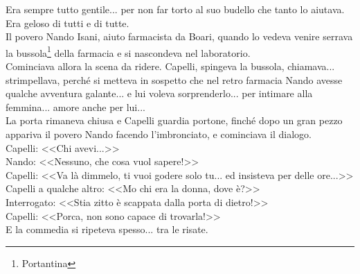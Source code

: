 \indent Era sempre tutto gentile... per non far torto al suo budello che tanto lo aiutava. Era geloso di tutti e di tutte.\\
\indent Il povero Nando Isani, aiuto farmacista da Boari, quando lo vedeva venire serrava la bussola\footnote{Portantina} della farmacia e si nascondeva nel laboratorio.\\
\indent Cominciava allora la scena da ridere. Capelli, spingeva la bussola, chiamava... strimpellava, perché si metteva in sospetto che nel retro farmacia Nando  avesse qualche avventura galante... e lui voleva sorprenderlo... per intimare alla femmina... amore anche per lui... \\
\indent La porta rimaneva chiusa e Capelli guardia portone, finché dopo un gran pezzo appariva il povero Nando  facendo l'imbronciato, e cominciava il dialogo.\\
\indent Capelli: <<Chi avevi...>>\\
\indent Nando: <<Nessuno, che cosa vuol sapere!>>\\
\indent Capelli: <<Va là dimmelo, ti vuoi godere solo tu... ed insisteva per delle ore...>>\\
\indent Capelli a qualche altro: <<Mo chi era la donna, dove è?>>\\
\indent Interrogato: <<Stia zitto è scappata dalla porta di dietro!>>\\
\indent Capelli: <<Porca, non sono capace di trovarla!>>\\
\indent E la commedia si ripeteva spesso... tra le risate.\\

